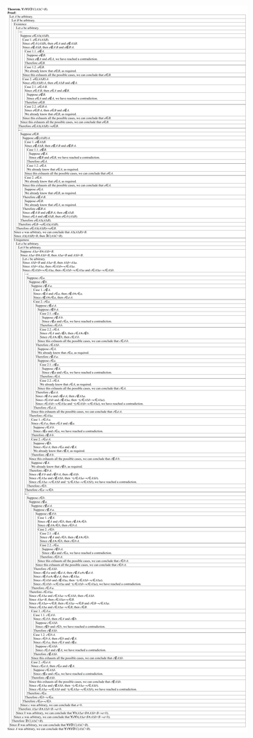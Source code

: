 \documentclass{article}
\begin{document}
\includegraphics[width=\textwidth,height=\textheight,keepaspectratio]{3_6_9_3}
\end{document}
